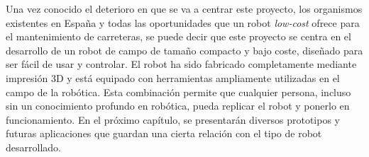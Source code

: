 Una vez conocido el deterioro en que se va a centrar este proyecto, los organismos existentes en España y todas las oportunidades que un robot \textit{low-cost} ofrece para el mantenimiento de carreteras, se puede decir que este proyecto se centra en el desarrollo de un robot de campo de tamaño compacto y bajo coste, diseñado para ser fácil de usar y controlar. El robot ha sido fabricado completamente mediante impresión 3D y está equipado con herramientas ampliamente utilizadas en el campo de la robótica. Esta combinación permite que cualquier persona, incluso sin un conocimiento profundo en robótica, pueda replicar el robot y ponerlo en funcionamiento. En el próximo capítulo, se presentarán diversos prototipos y futuras aplicaciones que guardan una cierta relación con el tipo de robot desarrollado.




